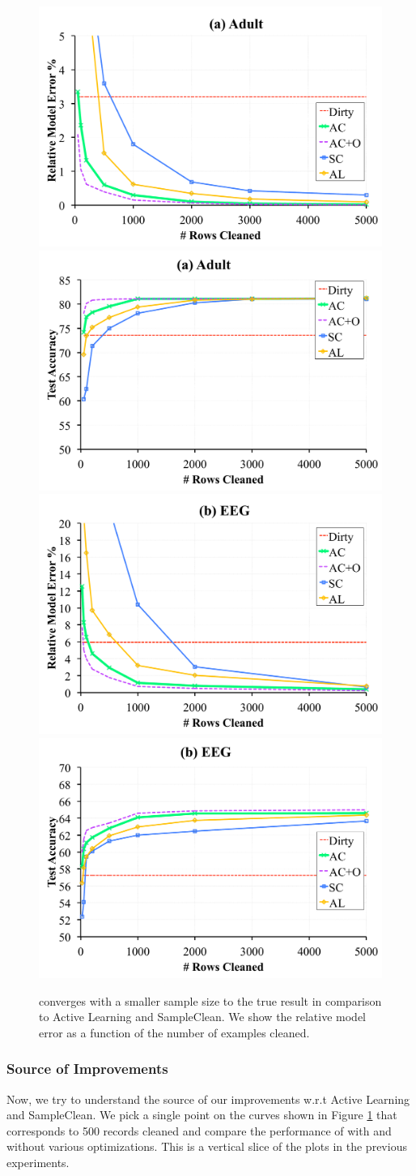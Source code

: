 \begin{figure}[ht!]
\centering
 \includegraphics[width=0.49\columnwidth]{exp/exp3b.pdf}
    \includegraphics[width=0.49\columnwidth]{exp/exp3bb.pdf}
  \includegraphics[width=0.49\columnwidth]{exp/exp3c.pdf}
  \includegraphics[width=0.49\columnwidth]{exp/exp3cc.pdf}
 \caption{\sys converges with a smaller sample size to the true result in comparison to Active Learning and SampleClean. We show the relative model error as a function of the number of examples cleaned. \label{prio-perf}}
\end{figure}

\subsubsection{Source of Improvements}
Now, we try to understand the source of our improvements w.r.t Active Learning and SampleClean.
We pick a single point on the curves shown in Figure \ref{prio-perf} that corresponds to 500 records cleaned and compare the performance of \sys with and without various optimizations.
This is a vertical slice of the plots in the previous experiments.

